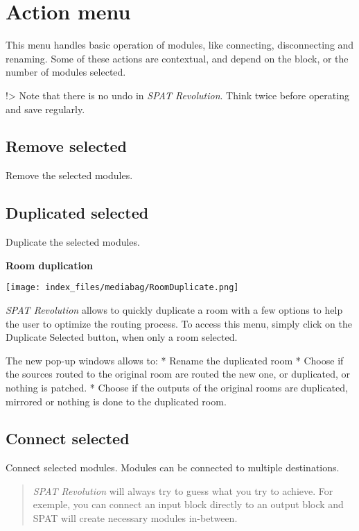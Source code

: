 \documentclass[
  letterpaper,
  DIV=11,
  numbers=noendperiod]{scrreport}
\begin{document}
\hypertarget{action-menu}{%
\section{Action menu}\label{action-menu}}

This menu handles basic operation of modules, like connecting,
disconnecting and renaming. Some of these actions are contextual, and
depend on the block, or the number of modules selected.

!\textgreater{} Note that there is no undo in \emph{SPAT Revolution}.
Think twice before operating and save regularly.

\hypertarget{remove-selected}{%
\subsection{Remove selected}\label{remove-selected}}

Remove the selected modules.

\hypertarget{duplicated-selected}{%
\subsection{Duplicated selected}\label{duplicated-selected}}

Duplicate the selected modules.

\textbf{Room duplication}

\texttt{[image: index\_files/mediabag/RoomDuplicate.png]}

\emph{SPAT Revolution} allows to quickly duplicate a room with a few
options to help the user to optimize the routing process. To access this
menu, simply click on the Duplicate Selected button, when only a room
selected.

The new pop-up windows allows to: * Rename the duplicated room * Choose
if the sources routed to the original room are routed the new one, or
duplicated, or nothing is patched. * Choose if the outputs of the
original rooms are duplicated, mirrored or nothing is done to the
duplicated room.

\hypertarget{connect-selected}{%
\subsection{Connect selected}\label{connect-selected}}

Connect selected modules. Modules can be connected to multiple
destinations.

\begin{quote}
\emph{SPAT Revolution} will always try to guess what you try to achieve.
For exemple, you can connect an input block directly to an output block
and SPAT will create necessary modules in-between.
\end{quote}
\end{document}

